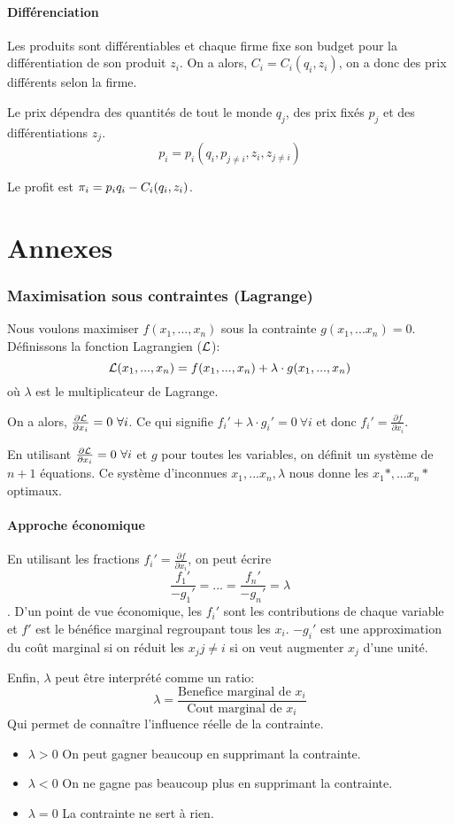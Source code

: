 \subsection{Différenciation}
Les produits sont différentiables et chaque firme fixe son budget
pour la différentiation de son produit $z_i$.
On a alors, $C_i = C_i(q_i, z_i)$, on a donc des prix différents selon la firme.

Le prix dépendra des quantités de tout le monde $q_j$,
des prix fixés $p_j$ et des différentiations $z_j$.
$$p_i = p_i(q_i, p_{j\neq i}, z_i, z_{j \neq i})$$

Le profit est $\pi_i = p_iq_i - C_i(q_i, z_i)$.





\part{Annexes}
\appendix
\section{Maximisation sous contraintes (Lagrange)}
Nous voulons maximiser $f(x_1,..., x_n)$ sous la contrainte $g(x_1,...x_n) = 0$.
Définissons la fonction Lagrangien ($\mathcal{L}$):
$$\mathcal{L}(x_1,..., x_n) = f(x_1,..., x_n) + \lambda\cdot g(x_1,..., x_n)$$
où $\lambda$ est le multiplicateur de Lagrange.

On a alors, $\frac{\partial \mathcal{L}}{\partial x_i} = 0\ \forall i$. Ce qui signifie
$f_i' + \lambda\cdot g_i' = 0\ \forall i$ et donc
$f_i' = \frac{\partial f}{\partial x_i}$.

En utilisant $\frac{\partial \mathcal{L}}{\partial x_i} = 0\ \forall i$ et $g$ pour
toutes les variables, on définit un système de $n+1$ équations. Ce système
d'inconnues $x_1,...x_n, \lambda$ nous donne les $x_1*,...x_n*$ optimaux.

\subsection{Approche économique}
En utilisant les fractions $f_i' = \frac{\partial f}{\partial x_i}$, on peut
écrire $$ \frac{f_1'}{-g_1'} = ... = \frac{f_n'}{-g_n'} = \lambda $$.
D'un point de vue économique, les $f_i'$ sont les contributions de chaque
variable et $f'$ est le bénéfice marginal regroupant tous les $x_i$.
$-g_i'$ est une approximation du coût marginal si on réduit les $x_j j\neq i$
si on veut augmenter $x_j$ d'une unité.

Enfin, $\lambda$ peut être interprété comme un ratio:
$$\lambda = \frac{\textrm{Benefice marginal de }x_i}{\textrm{Cout marginal de }x_i}$$
Qui permet de connaître l'influence réelle de la contrainte.
\begin{itemize}
\item $\lambda > 0$ On peut gagner beaucoup en supprimant la contrainte.
\item $\lambda < 0$ On ne gagne pas beaucoup plus en supprimant la contrainte.
\item $\lambda = 0$ La contrainte ne sert à rien.
\end{itemize}

